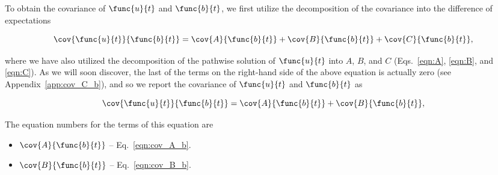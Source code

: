 To obtain the covariance of $\func{u}{t}$ and $\func{b}{t}$, we first utilize the decomposition of the covariance into the difference of expectations

\begin{equation}
    \cov{\func{u}{t}}{\func{b}{t}} = \cov{A}{\func{b}{t}} + \cov{B}{\func{b}{t}} + \cov{C}{\func{b}{t}},
\end{equation}

where we have also utilized the decomposition of the pathwise solution of $\func{u}{t}$ into $A$, $B$, and $C$ (Eqs.~\ref{eqn:A}, \ref{eqn:B}, and \ref{eqn:C}). As we will soon discover, the last of the terms on the right-hand side of the above equation is actually zero (see Appendix~\ref{app:cov_C_b}), and so we report the covariance of $\func{u}{t}$ and $\func{b}{t}$ as 

\begin{equation}
    \cov{\func{u}{t}}{\func{b}{t}} = \cov{A}{\func{b}{t}} + \cov{B}{\func{b}{t}},
    \label{eqn:cov_u_b}
\end{equation}

The equation numbers for the terms of this equation are 

\begin{itemize}
	\item [] $\cov{A}{\func{b}{t}}$ -- Eq.~\ref{eqn:cov_A_b}.
	\item [] $\cov{B}{\func{b}{t}}$ -- Eq.~\ref{eqn:cov_B_b}.
\end{itemize}

